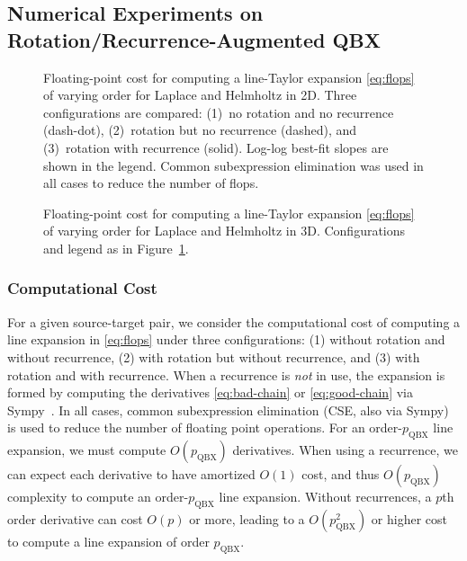 \documentclass[12pt]{article}
\theoremstyle{definition}
\theoremstyle{plain}
\theoremstyle{definition}
\begin{document}
\subsection{Numerical Experiments on Rotation/Recurrence-Augmented QBX}

\begin{figure}[h]
\centering


\caption{Floating-point cost for computing a line-Taylor expansion \eqref{eq:flops} of varying order for Laplace and Helmholtz in 2D. Three configurations are compared: (1)~no rotation and no recurrence (dash-dot), (2)~rotation but no recurrence (dashed), and (3)~rotation with recurrence (solid). Log-log best-fit slopes are shown in the legend. Common subexpression elimination was used in all cases to reduce the number of flops.}
\label{fig:cost-2d}
\end{figure}

\begin{figure}[h]
\centering


\caption{Floating-point cost for computing a line-Taylor expansion \eqref{eq:flops} of varying order for Laplace and Helmholtz in 3D. Configurations and legend as in Figure~\ref{fig:cost-2d}.}
\label{fig:cost-3d}
\end{figure}

\subsubsection{Computational Cost}

For a given source-target pair, we consider the computational cost of computing a line expansion in \eqref{eq:flops} under three configurations: (1) without rotation and without recurrence, (2) with rotation but without recurrence, and (3) with rotation and with recurrence. When a recurrence is \emph{not} in use, the expansion is formed by computing the derivatives \eqref{eq:bad-chain} or \eqref{eq:good-chain} via Sympy~\cite{10.7717/peerj-cs.103}. In all cases, common subexpression elimination (CSE, also via Sympy) is used to reduce the number of floating point operations. For an order-$p_{\text{QBX}}$ line expansion, we must compute $O(p_{\text{QBX}})$ derivatives. When using a recurrence, we can expect each derivative to have amortized $O(1)$ cost, and thus $O(p_{\text{QBX}})$ complexity to compute an order-$p_{\text{QBX}}$ line expansion. Without recurrences, a $p$th order derivative can cost $O(p)$ or more, leading to a $O(p_{\text{QBX}}^2)$ or higher cost to compute a line expansion of order $p_{\text{QBX}}$.
\end{document}
